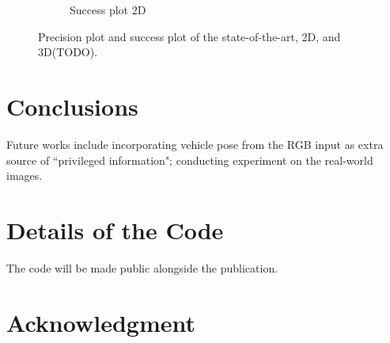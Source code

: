 \documentclass[10pt,twocolumn,letterpaper]{article}
\begin{document}
\begin{figure}[t]
\begin{subfigure}[c]{0.4\textwidth}
        \caption{\small{Success plot 2D}}
    \end{subfigure}
\caption{Precision plot and success plot of the state-of-the-art, 2D, and 3D(TODO).
}
\label{fig:precision_plot_and_success_plot_OBT100}
\end{figure}

\section{Conclusions}

Future works include incorporating vehicle pose from the RGB input as extra source of ``privileged information"; conducting experiment on the real-world images.

\section*{Details of the Code}
 The code will be made public alongside the publication.

\section*{Acknowledgment}

{\small


}
\end{document}
